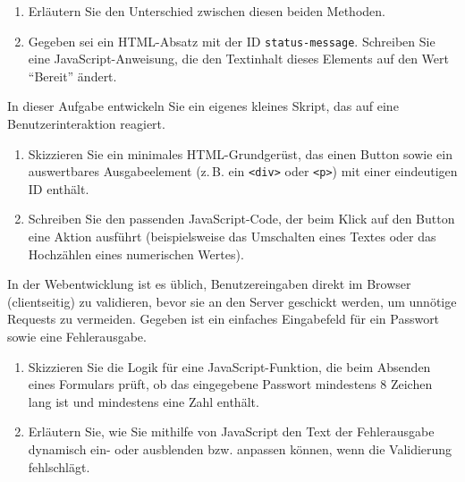 \documentclass[11pt, a4paper, oneside]{article}
\begin{document}
	\begin{enumerate}[label=\alph*)]
		\item Erläutern Sie den Unterschied zwischen diesen beiden Methoden.
		\item Gegeben sei ein HTML-Absatz mit der ID \texttt{status-message}.
		Schreiben Sie eine JavaScript-Anweisung, die den Textinhalt dieses Elements auf den Wert ``Bereit'' ändert.
	\end{enumerate}
	
	\lines[4cm]
	
	
	
	In dieser Aufgabe entwickeln Sie ein eigenes kleines Skript, das auf eine Benutzerinteraktion reagiert.
	
	\begin{enumerate}[label=\alph*)]
		\item Skizzieren Sie ein minimales HTML-Grundgerüst, das einen Button sowie ein auswertbares Ausgabeelement (z.\,B. ein \texttt{<div>} oder \texttt{<p>}) mit einer eindeutigen ID enthält.
		\item Schreiben Sie den passenden JavaScript-Code, der beim Klick auf den Button eine Aktion ausführt (beispielsweise das Umschalten eines Textes oder das Hochzählen eines numerischen Wertes).
	\end{enumerate}
	
	
	
	In der Webentwicklung ist es üblich, Benutzereingaben direkt im Browser (clientseitig) zu validieren, bevor sie an den Server geschickt werden, um unnötige Requests zu vermeiden.
	Gegeben ist ein einfaches Eingabefeld für ein Passwort sowie eine Fehlerausgabe.
	
	\begin{enumerate}[label=\alph*)]
		\item Skizzieren Sie die Logik für eine JavaScript-Funktion, die beim Absenden eines Formulars prüft, ob das eingegebene Passwort mindestens 8 Zeichen lang ist und mindestens eine Zahl enthält.
		\item Erläutern Sie, wie Sie mithilfe von JavaScript den Text der Fehlerausgabe dynamisch ein- oder ausblenden bzw. anpassen können, wenn die Validierung fehlschlägt.
	\end{enumerate}
	
	\lines[5cm]
	
	
	
\end{document}
